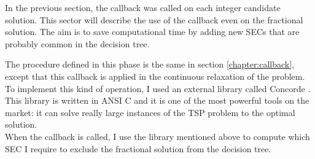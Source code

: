 In the previous section, the callback was called on each integer candidate solution. This sector will describe the use of the callback even on the fractional solution. 
The aim is to save computational time by adding new SECs that are probably common in the decision tree. 

The procedure defined in this phase is the same in section \ref{chapter:callback}, except that this callback is applied in the continuous relaxation of the problem.
To implement this kind of operation, I used an external library called Concorde \cite{concorde}. This library is written in ANSI C and it is one of the most powerful tools on the market: it can solve really large instances of the TSP problem to the optimal solution.\\
When the callback is called, I use the library mentioned above to compute which SEC I require to exclude the fractional solution from the decision tree.